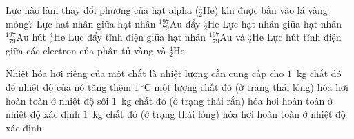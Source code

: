 	\begin{ex}%
		Lực nào làm thay đổi phương của hạt alpha (${}^4_2\text{He}$) khi được bắn vào lá vàng mỏng?
		\choice
		{Lực hạt nhân giữa hạt nhân ${}^{197}_{\phantom{1}79}\text{Au}$ đẩy ${}^4_2\text{He}$}
		{Lực hạt nhân giữa hạt nhân ${}^{197}_{\phantom{1}79}\text{Au}$ hút ${}^4_2\text{He}$}
		{\True Lực đẩy tĩnh điện giữa hạt nhân ${}^{197}_{\phantom{1}79}\text{Au}$ và ${}^4_2\text{He}$}
		{Lực hút tĩnh điện giữa các electron của phân tử vàng và ${}^4_2\text{He}$}
	\end{ex}

	\begin{ex}%
		Nhiệt hóa hơi riêng của một chất là nhiệt lượng cần cung cấp cho
		\choice
		{$1$~kg chất đó để nhiệt độ của nó tăng thêm $1\,^\circ\text{C}$}
		{một lượng chất đó (ở trạng thái lỏng) hóa hơi hoàn toàn ở nhiệt độ sôi}
		{$1$~kg chất đó (ở trạng thái rắn) hóa hơi hoàn toàn ở nhiệt độ xác định}
		{\True $1$~kg chất đó (ở trạng thái lỏng) hóa hơi hoàn toàn ở nhiệt độ xác định}
	\end{ex}

